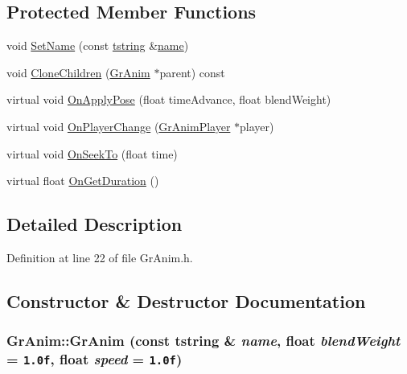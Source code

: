 \subsection*{Protected Member Functions}
\begin{CompactItemize}
\item 
void \hyperlink{class_gr_anim_3f5d565461de134898fad1dcfc04c17a}{SetName} (const \hyperlink{common__afx_8h_816fa58fd77499b0edb2c69ebe803d5c}{tstring} \&\hyperlink{glext__bak_8h_bb62efe59ccdd153ce42e1a418352209}{name})
\item 
void \hyperlink{class_gr_anim_d83af685b7a05de92682293829ca5268}{CloneChildren} (\hyperlink{class_gr_anim}{GrAnim} $\ast$parent) const 
\item 
virtual void \hyperlink{class_gr_anim_dec6db03770e91d166da4c5f87882a39}{OnApplyPose} (float timeAdvance, float blendWeight)
\item 
virtual void \hyperlink{class_gr_anim_9bf82e4b036b8a2649745dc993158067}{OnPlayerChange} (\hyperlink{class_gr_anim_player}{GrAnimPlayer} $\ast$player)
\item 
virtual void \hyperlink{class_gr_anim_8debb19e5a8a60ae9a4f2d4a95042108}{OnSeekTo} (float time)
\item 
virtual float \hyperlink{class_gr_anim_a3de284e428631ca76ddf0cc8af9b787}{OnGetDuration} ()
\end{CompactItemize}


\subsection{Detailed Description}


Definition at line 22 of file GrAnim.h.

\subsection{Constructor \& Destructor Documentation}
\hypertarget{class_gr_anim_e95ba9277c302b62a1aa920250850c78}{
\subsubsection[{GrAnim}]{\setlength{\rightskip}{0pt plus 5cm}GrAnim::GrAnim (const {\bf tstring} \& {\em name}, \/  float {\em blendWeight} = {\tt 1.0f}, \/  float {\em speed} = {\tt 1.0f})}}
\label{class_gr_anim_e95ba9277c302b62a1aa920250850c78}





